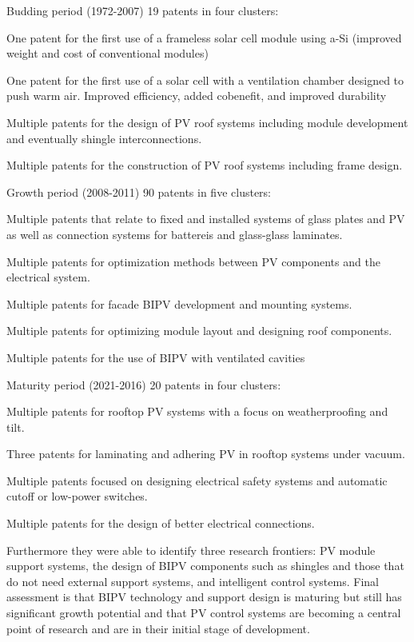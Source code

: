 \documentclass[11pt,a4paper]{article}
\newenvironment{enumerate*}%
  {\begin{enumerate}[rightmargin=\dimexpr\linewidth-120mm-\leftmargin\relax]%
    \setlength{\itemsep}{0pt}%
    \setlength{\parskip}{0pt}}%
  {\end{enumerate}}
\begin{document}
Budding period (1972-2007) 19 patents in four clusters:
\begin{enumerate*}
    \item One patent for the first use of a frameless solar cell module using a-Si (improved weight and cost of conventional modules)
    \item One patent for the first use of a solar cell with a ventilation chamber designed to push warm air. Improved efficiency, added cobenefit, and improved durability
    \item Multiple patents for the design of PV roof systems including module development and eventually shingle interconnections.
    \item Multiple patents for the construction of PV roof systems including frame design.
\end{enumerate*}

Growth period (2008-2011) 90 patents in five clusters:
\begin{enumerate*}
    \item Multiple patents that relate to fixed and installed systems of glass plates and PV as well as connection systems for battereis and glass-glass laminates.
    \item Multiple patents for optimization methods between PV components and the electrical system.
    \item Multiple patents for facade BIPV development and mounting systems.
    \item Multiple patents for optimizing module layout and designing roof components.
    \item Multiple patents for the use of BIPV with ventilated cavities
\end{enumerate*}

Maturity period (2021-2016) 20 patents in four clusters:
\begin{enumerate*}
    \item Multiple patents for rooftop PV systems with a focus on weatherproofing and tilt.
    \item Three patents for laminating and adhering PV in rooftop systems under vacuum. 
    \item Multiple patents focused on designing electrical safety systems and automatic cutoff or low-power switches.
    \item Multiple patents for the design of better electrical connections.
\end{enumerate*}

Furthermore they were able to identify three research frontiers: PV module support systems, the design of BIPV components such as shingles and those that do not need external support systems, and intelligent control systems. Final assessment is that BIPV technology and support design is maturing but still has significant growth potential and that PV control systems are becoming a central point of research and are in their initial stage of development. 
\end{document}
